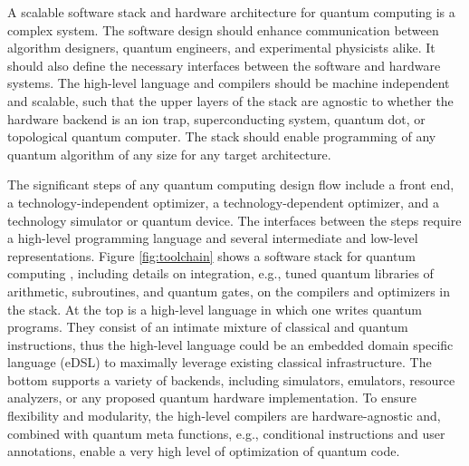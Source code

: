 \documentclass[journal]{IEEEtran}
\begin{document}
A scalable software stack and hardware architecture for quantum computing is a complex system.
The software design should enhance communication between algorithm designers, quantum engineers, and experimental physicists alike.
It should also define the necessary interfaces between the software and hardware systems.
The high-level language and compilers should be machine independent and scalable, such that the upper layers of the stack are agnostic to whether the hardware backend is an ion trap, superconducting system, quantum dot, or topological quantum computer.
The stack should enable programming of any quantum algorithm of any size for any target architecture.

The significant steps of any quantum computing design flow \cite{svore2006layered} include a front end, a technology-independent optimizer, a technology-dependent optimizer, and a technology simulator or quantum device.  The interfaces between the steps require a high-level programming language and several intermediate and low-level representations.
Figure \ref{fig:toolchain} shows a software stack for quantum computing \cite{stack}, including details on integration, e.g., tuned quantum libraries of arithmetic, subroutines, and quantum gates, on the compilers and optimizers in the stack.
At the top is a high-level language in which one writes quantum programs.
They consist of an intimate mixture of classical and quantum instructions, thus the high-level language could be an embedded domain specific language (eDSL) to maximally leverage existing classical infrastructure.
The bottom supports a variety of backends, including simulators, emulators, resource analyzers, or any proposed quantum hardware implementation.
To ensure flexibility and modularity, the high-level compilers are hardware-agnostic and, combined with quantum meta functions, e.g., conditional instructions and user annotations, enable a very high level of optimization of quantum code.

\end{document}
